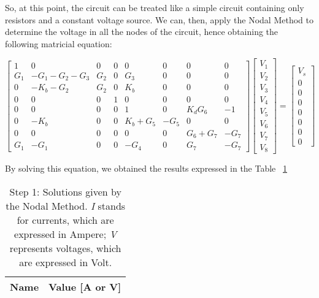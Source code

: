 So, at this point, the circuit can be treated like a simple circuit containing only resistors and a constant voltage source. We can, then, apply the Nodal Method to determine the voltage in all the nodes of the circuit, hence obtaining the following matricial equation:

\begin{equation}
	\begin{bmatrix}
		1 & 0 & 0 & 0 & 0 & 0 & 0 & 0 \\
		G_1 & -G_1 - G_2 -G_3 & G_2 & 0 & G_3 & 0 & 0 & 0 \\
		0 & -K_b - G_2 & G_2 & 0 & K_b & 0 & 0 & 0 \\
		0 & 0 & 0 & 1 & 0 & 0 & 0 & 0 \\
		0 & 0 & 0 & 0 & 1 & 0 & K_dG_6 & -1 \\
		0 & -K_b & 0 & 0 & K_b + G_5 & -G_5 & 0 & 0 \\
		0 & 0 & 0 & 0 & 0 & 0 & G_6 + G_7 & -G_7 \\
		G_1 & -G_1 & 0 & 0 & -G_4 & 0 & G_7 & -G_7 
	\end{bmatrix}
	\begin{bmatrix}
		V_1 \\
		V_2 \\
		V_3 \\
		V_4 \\
		V_5 \\
		V_6 \\
		V_7 \\
		V_8
	\end{bmatrix}
	=  
	\begin{bmatrix}
		V_s \\
		0 \\
		0 \\
		0 \\
		0 \\
		0 \\
		0 \\
		0
	\end{bmatrix}
\end{equation}
 
 By solving this equation, we obtained the results expressed in the Table ~\ref{tab:nodal1}
 
 \FloatBarrier
 \begin{table}[h]
 	\centering
 	\begin{tabular}{|l|r|}
 		\hline    
 		{\bf Name} & {\bf Value [A or V]} \\ \hline
 		
 	\end{tabular}
 	\caption{Step 1: Solutions given by the Nodal Method. {\em I} stands for currents, which
 		are expressed in Ampere; {\it V} represents voltages, which are expressed in
 		Volt.}
 	\label{tab:nodal1}
 \end{table}
 \FloatBarrier
 
